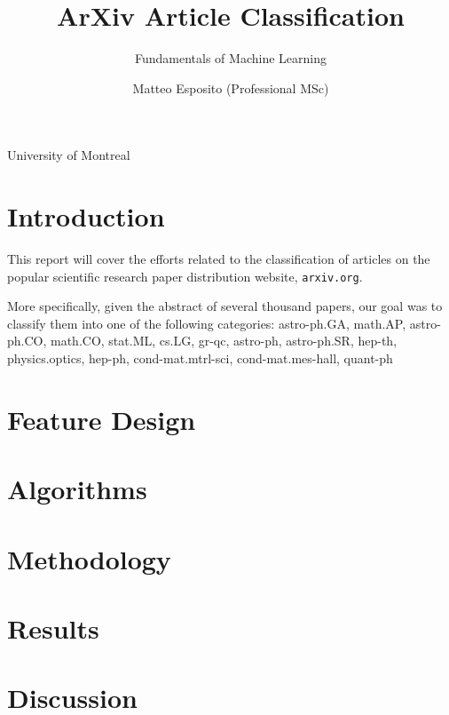 \documentclass[a4paper,12pt]{article}
\title{\textbf{ArXiv Article Classification}}
\author{Fundamentals of Machine Learning}
\date{Matteo Esposito (Professional MSc)}
\def\code#1{\texttt{#1}}
\begin{document}
\begin{titlingpage}
  \maketitle
  \centering
  \vfill
  {\large{University of Montreal}}\par
  {\large{}}
\end{titlingpage}

\newpage

\section{Introduction}

This report will cover the efforts related to the classification of articles on the popular scientific research paper distribution website, \code{arxiv.org}. 

\medskip

More specifically, given the abstract of several thousand papers, our goal was to classify them into one of the following categories: astro-ph.GA, math.AP, astro-ph.CO, math.CO, stat.ML, cs.LG, gr-qc, astro-ph, astro-ph.SR, hep-th, physics.optics, hep-ph, cond-mat.mtrl-sci, cond-mat.mes-hall, quant-ph

\section{Feature Design}



\section{Algorithms}



\section{Methodology}



\section{Results}



\section{Discussion}
\end{document}

